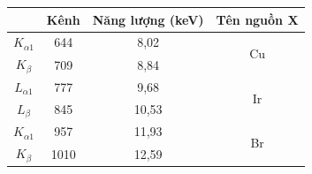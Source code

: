 \documentclass{article}
\begin{document}
\begin{table}[h]
\centering
\begin{tabular}{|c|c|c|c|}
\hline
            & Kênh & Năng lượng (keV) & \multicolumn{1}{l|}{Tên nguồn X} \\ \hline
$K_{\alpha 1}$ & 644  & 8,02             & \multirow{2}{*}{Cu}              \\ \cline{1-3}
$K_{\beta }$  & 709  & 8,84             &                                  \\ \hline
$L_{\alpha 1}$    & 777  & 9,68             & \multirow{2}{*}{Ir}              \\ \cline{1-3}
$L_\beta $     & 845  & 10,53            &                                  \\ \hline
$K_{\alpha 1}$    & 957  & 11,93            & \multirow{2}{*}{Br}              \\ \cline{1-3}
$K_\beta $     & 1010 & 12,59            &                                  \\ \hline
\end{tabular}
\end{table}
\newpage
\clearpage\thispagestyle{empty}\addtocounter{page}{-1} 
\clearpage
\mbox{}
\newpage
\end{document}
